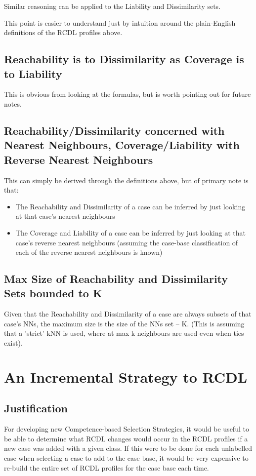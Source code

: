 \documentclass[a4paper,11pt]{report}
\begin{document}
Similar reasoning can be applied to the Liability and Dissimilarity sets.

This point is easier to understand just by intuition around the plain-English definitions of the RCDL profiles above.

\subsection{Reachability is to Dissimilarity as Coverage is to Liability}
This is obvious from looking at the formulas, but is worth pointing out for future notes.

\subsection{Reachability/Dissimilarity concerned with Nearest Neighbours, Coverage/Liability with Reverse Nearest Neighbours \label{sec:RdWithNnClWithRnn}}
This can simply be derived through the definitions above, but of primary note is that:
\begin{itemize}
	\item The Reachability and Dissimilarity of a case can be inferred by just looking at that case's nearest neighbours
	\item The Coverage and Liability of a case can be inferred by just looking at that case's reverse nearest neighbours (assuming the case-base classification of each of the reverse nearest neighbours is known)
\end{itemize}

\subsection{Max Size of Reachability and Dissimilarity Sets bounded to K}
Given that the Reachability and Dissimilarity of a case are always subsets of that case's NNs, the maximum size is the size of the NNs set – K. (This is assuming that a 'strict' kNN is used, where at max k neighbours are used even when ties exist).

\section{An Incremental Strategy to RCDL}
\subsection{Justification}
For developing new Competence-based Selection Strategies, it would be useful to be able to determine what RCDL changes would occur in the RCDL profiles if a new case was added with a given class. If this were to be done for each unlabelled case when selecting a case to add to the case base, it would be very expensive to re-build the entire set of RCDL profiles for the case base each time.
\end{document}
